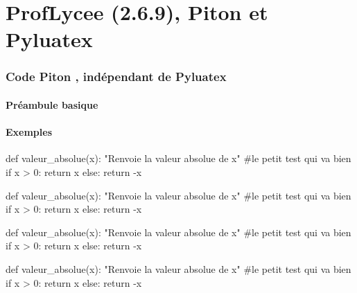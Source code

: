 \documentclass[french,a4paper,10pt]{article}
\def\PLver{2.6.9}
\begin{document}
\part*{ProfLycee (\PLver), Piton et Pyluatex}

\section{Code \og Piton \fg{}, indépendant de Pyluatex}

\subsection{Préambule basique}

{\small {}}

\subsection{Exemples}

{\small \begin{codehigh}
\begin{CodePiton}{}
def valeur_absolue(x):
    "Renvoie la valeur absolue de x"
    #le petit test qui va bien
    if x > 0:
        return x
    else:
    return -x
\end{CodePiton}
\end{codehigh}}

\begin{CodePiton}{}
def valeur_absolue(x):
	"Renvoie la valeur absolue de x"
	#le petit test qui va bien
	if x > 0:
		return x
	else:
		return -x
\end{CodePiton}

{\small \begin{codehigh}
\begin{CodePiton}[Style=Classique,Largeur=10cm]{}
def valeur_absolue(x):
    "Renvoie la valeur absolue de x"
    #le petit test qui va bien
    if x > 0:
        return x
    else:
    return -x
\end{CodePiton}
\end{codehigh}}

\begin{CodePiton}[Style=Classique,Largeur=10cm]{}
def valeur_absolue(x):
	"Renvoie la valeur absolue de x"
	#le petit test qui va bien
	if x > 0:
		return x
	else:
		return -x
\end{CodePiton}
\end{document}
